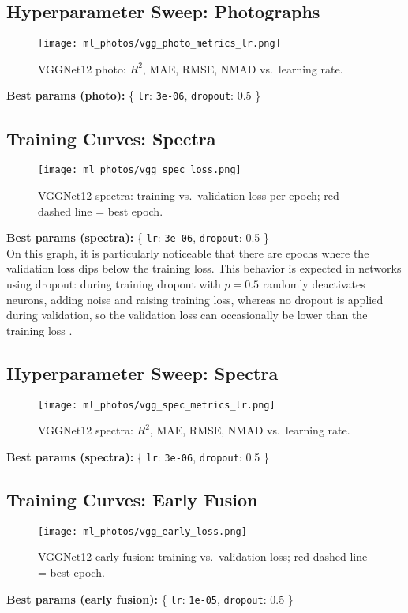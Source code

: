\documentclass[english,bachelor,oneside]{ctufit-thesis}
\begin{document}
\subsection{Hyperparameter Sweep: Photographs}
\begin{figure}[H]
  \centering
  \texttt{[image: ml\_photos/vgg\_photo\_metrics\_lr.png]}
  \caption{VGGNet12 photo: $R^2$, MAE, RMSE, NMAD vs.\ learning rate.}
  \label{fig:vgg_photo_metrics}
\end{figure}
\noindent\textbf{Best params (photo):} \{ \texttt{lr}: \verb|3e-06|, \texttt{dropout}: 0.5 \}\\

\subsection{Training Curves: Spectra}
\begin{figure}[H]
  \centering
  \texttt{[image: ml\_photos/vgg\_spec\_loss.png]}
  \caption{VGGNet12 spectra: training vs.\ validation loss per epoch; red dashed line = best epoch.}
  \label{fig:vgg_spec_loss}
\end{figure}
\noindent\textbf{Best params (spectra):} \{ \texttt{lr}: \verb|3e-06|, \texttt{dropout}: 0.5 \}\\

\noindent On this graph, it is particularly noticeable that there are epochs where the validation loss dips below the training loss. This behavior is expected in networks using dropout: during training dropout with $p=0.5$ randomly deactivates neurons, adding noise and raising training loss, whereas no dropout is applied during validation, so the validation loss can occasionally be lower than the training loss \cite{srivastava2014dropout}.


\subsection{Hyperparameter Sweep: Spectra}
\begin{figure}[H]
  \centering
  \texttt{[image: ml\_photos/vgg\_spec\_metrics\_lr.png]}
  \caption{VGGNet12 spectra: $R^2$, MAE, RMSE, NMAD vs.\ learning rate.}
  \label{fig:vgg_spec_metrics}
\end{figure}
\noindent\textbf{Best params (spectra):} \{ \texttt{lr}: \verb|3e-06|, \texttt{dropout}: 0.5 \}\\

\subsection{Training Curves: Early Fusion}
\begin{figure}[H]
  \centering
  \texttt{[image: ml\_photos/vgg\_early\_loss.png]}
  \caption{VGGNet12 early fusion: training vs.\ validation loss; red dashed line = best epoch.}
  \label{fig:vgg_early_loss}
\end{figure}
\noindent\textbf{Best params (early fusion):} \{ \texttt{lr}: \verb|1e-05|, \texttt{dropout}: 0.5 \}\\
\end{document}
